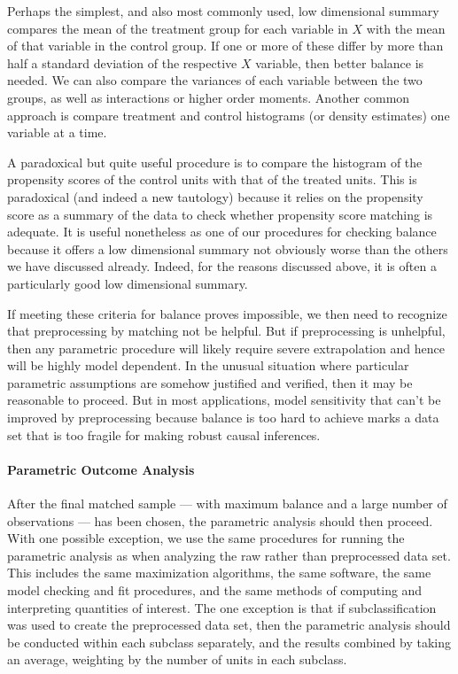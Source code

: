 \documentclass[11pt,titlepage]{article}
\begin{document}
Perhaps the simplest, and also most commonly used, low dimensional
summary compares the mean of the treatment group for each variable in
$X$ with the mean of that variable in the control group.  If one or
more of these differ by more than half a standard deviation of the
respective $X$ variable, then better balance is needed.  We can also
compare the variances of each variable between the two groups, as well
as interactions or higher order moments.  Another common approach is
compare treatment and control histograms (or density estimates) one
variable at a time.

A paradoxical but quite useful procedure is to compare the histogram
of the propensity scores of the control units with that of the treated
units. This is paradoxical (and indeed a new tautology) because it
relies on the propensity score as a summary of the data to check
whether propensity score matching is adequate.  It is useful
nonetheless as one of our procedures for checking balance because it
offers a low dimensional summary not obviously worse than the others
we have discussed already.  Indeed, for the reasons discussed above,
it is often a particularly good low dimensional summary.

If meeting these criteria for balance proves impossible, we then need
to recognize that preprocessing by matching not be helpful.  But if
preprocessing is unhelpful, then any parametric procedure will likely
require severe extrapolation and hence will be highly model dependent.
In the unusual situation where particular parametric assumptions are
somehow justified and verified, then it may be reasonable to proceed.
But in most applications, model sensitivity that can't be improved by
preprocessing because balance is too hard to achieve marks a data set
that is too fragile for making robust causal inferences.

\paragraph{Parametric Outcome Analysis}  
After the final matched sample --- with maximum balance and a large
number of observations --- has been chosen, the parametric analysis
should then proceed.  With one possible exception, we use the same
procedures for running the parametric analysis as when analyzing the
raw rather than preprocessed data set.  This includes the same
maximization algorithms, the same software, the same model checking
and fit procedures, and the same methods of computing and interpreting
quantities of interest.  The one exception is that if
subclassification was used to create the preprocessed data set, then
the parametric analysis should be conducted within each subclass
separately, and the results combined by taking an average, weighting
by the number of units in each subclass.
\end{document}
